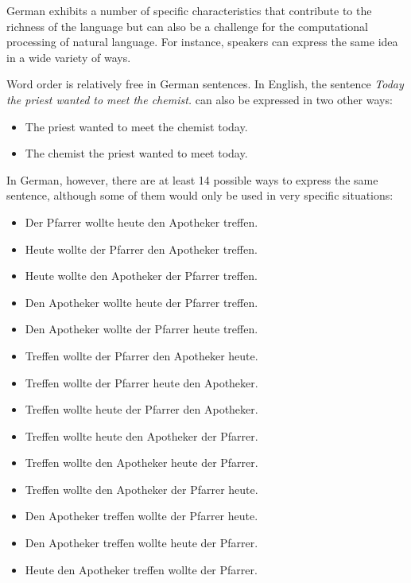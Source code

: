 \begin{multicols}{2}
German exhibits a number of specific characteristics that contribute to the richness of the language but can also be a challenge for the computational processing of natural language. For instance, speakers can express the same idea in a wide variety of ways.


Word order is relatively free in German sentences. In English, the sentence \textit{Today the priest wanted to meet the chemist.} can also be expressed in two other ways:

\begin{itemize}
\item The priest wanted to meet the chemist today.
\item The chemist the priest wanted to meet today.
\end{itemize} 

In German, however, there are at least 14 possible ways to express the same sentence, although some of them would only be used in very specific situations:

\begin{itemize}
\item Der Pfarrer wollte heute den Apotheker treffen.
\item Heute wollte der Pfarrer den Apotheker treffen.
\item Heute wollte den Apotheker der Pfarrer treffen.
\item Den Apotheker wollte heute der Pfarrer treffen.
\item Den Apotheker wollte der Pfarrer heute treffen.
\item Treffen wollte der Pfarrer den Apotheker heute.
\item Treffen wollte der Pfarrer heute den Apotheker.
\item Treffen wollte heute der Pfarrer den Apotheker.
\item Treffen wollte heute den Apotheker der Pfarrer.
\item Treffen wollte den Apotheker heute der Pfarrer.
\item Treffen wollte den Apotheker der Pfarrer heute.
\item Den Apotheker treffen wollte der Pfarrer heute.
\item Den Apotheker treffen wollte heute der Pfarrer.
\item Heute den Apotheker treffen wollte der Pfarrer.
\end{itemize}


\end{multicols}
